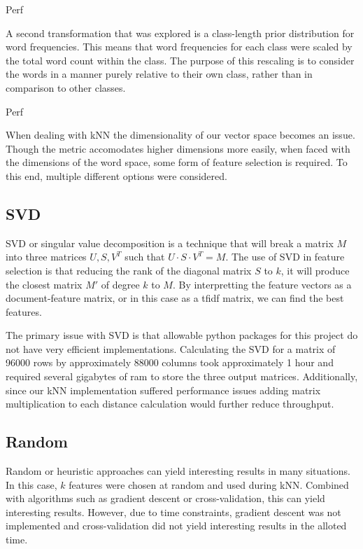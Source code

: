 \documentclass[10pt,twocolumn]{article}
\begin{document}
Perf

A second transformation that was explored is a class-length prior distribution for word frequencies. This means that word frequencies for each class were scaled by the total word count within the class. The purpose of this rescaling is to consider the words in a manner purely relative to their own class, rather than in comparison to other classes.

Perf

When dealing with kNN the dimensionality of our vector space becomes an issue. Though the metric accomodates higher dimensions more easily, when faced with the dimensions of the word space, some form of feature selection is required. To this end, multiple different options were considered.   

\subsection*{SVD}

SVD or singular value decomposition is a technique that will break a matrix $M$ into three matrices $U, S, V^T$ such that $U \cdot S \cdot V^T = M$. The use of SVD in feature selection is that reducing the rank of the diagonal matrix $S$ to $k$, it will produce the closest matrix $M'$ of degree $k$ to $M$. By interpretting the feature vectors as a document-feature matrix, or in this case as a tfidf matrix, we can find the best features. 

The primary issue with SVD is that allowable python packages for this project do not have very efficient implementations. Calculating the SVD for a matrix of 96000 rows by approximately 88000 columns took approximately 1 hour and required several gigabytes of ram to store the three output matrices. Additionally, since our kNN implementation suffered performance issues adding matrix multiplication to each distance calculation would further reduce throughput.

\subsection*{Random}

Random or heuristic approaches can yield interesting results in many situations. In this case, $k$ features were chosen at random and used during kNN. Combined with algorithms such as gradient descent or cross-validation, this can yield interesting results. However, due to time constraints, gradient descent was not implemented and cross-validation did not yield interesting results in the alloted time.
\end{document}
